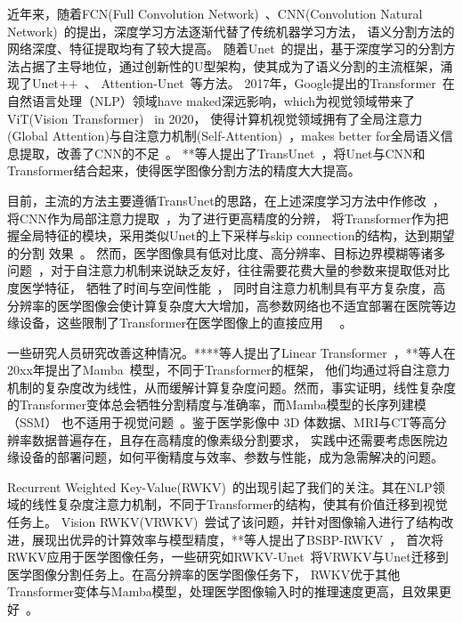 \documentclass[conference]{IEEEtran}   %
\begin{document}
近年来，随着FCN(Full Convolution Network)~\cite{FCN}、CNN(Convolution Natural Network)~\cite{CNN}的提出，深度学习方法逐渐代替了传统机器学习方法，
语义分割方法的网络深度、特征提取均有了较大提高。
随着Unet~\cite{Unet}的提出，基于深度学习的分割方法占据了主导地位，通过创新性的U型架构，使其成为了语义分割的主流框架，涌现了Unet++~\cite{unet++}、
Attention-Unet~\cite{attetion-unet}等方法。
2017年，Google提出的Transformer~\cite{Transformer}在自然语言处理（NLP）领域have maked深远影响，which为视觉领域带来了ViT(Vision Transformer)~\cite{ViT} in 2020，
使得计算机视觉领域拥有了全局注意力(Global Attention)与自注意力机制(Self-Attention)~\cite{Transformer}，makes better for全局语义信息提取，改善了CNN的不足~\cite{lack for CNN}。
**等人提出了TransUnet~\cite{transunet}，将Unet与CNN和Transformer结合起来，使得医学图像分割方法的精度大大提高。

目前，主流的方法主要遵循TransUnet的思路，在上述深度学习方法中作修改~\cite{分割方法综述}，将CNN作为局部注意力提取~\cite{EViT-Unet}，为了进行更高精度的分辨，
将Transformer作为把握全局特征的模块，采用类似Unet的上下采样与skip connection的结构，达到期望的分割
效果~\cite{Medical Image Segmentation: A Comprehensive Review of Deep Learning Methods}。
然而，医学图像具有低对比度、高分辨率、目标边界模糊等诸多问题~\cite{feature of medical img}，对于自注意力机制来说缺乏友好，往往需要花费大量的参数来提取低对比度医学特征，
牺牲了时间与空间性能~\cite{lack of Transformer on medical image}，
同时自注意力机制具有平方复杂度，高分辨率的医学图像会使计算复杂度大大增加，高参数网络也不适宜部署在医院等边缘设备，这些限制了Transformer在医学图像上的直接应用~\cite{transunet}
~\cite{h2former}。

一些研究人员研究改善这种情况。****等人提出了Linear Transformer~\cite{Linear Transformer}，**等人在20xx年提出了Mamba~\cite{Mamba}模型，不同于Transformer的框架，
他们均通过将自注意力机制的复杂度改为线性，从而缓解计算复杂度问题。然而，事实证明，线性复杂度的Transformer变体总会牺牲分割精度与准确率，而Mamba模型的长序列建模（SSM）
也不适用于视觉问题~\cite{mamba out}。鉴于医学影像中 3D 体数据、MRI与CT等高分辨率数据普遍存在，且存在高精度的像素级分割要求，
实践中还需要考虑医院边缘设备的部署问题，如何平衡精度与效率、参数与性能，成为急需解决的问题。

Recurrent Weighted Key-Value(RWKV)~\cite{rwkv}的出现引起了我们的关注。其在NLP领域的线性复杂度注意力机制，不同于Transformer的结构，使其有价值迁移到视觉任务上。
Vision RWKV(VRWKV)~\cite{visionrwkv}尝试了该问题，并针对图像输入进行了结构改进，展现出优异的计算效率与模型精度，**等人提出了BSBP-RWKV~\cite{BSBP-RWKV}，
首次将RWKV应用于医学图像任务，一些研究如RWKV-Unet~\cite{RWKV-UNet}将VRWKV与Unet迁移到医学图像分割任务上。在高分辨率的医学图像任务下，
RWKV优于其他Transformer变体与Mamba模型，处理医学图像输入时的推理速度更高，且效果更好~\cite{rwkv-sam}。
\end{document}
